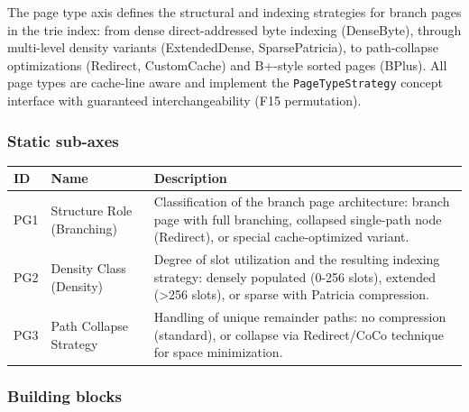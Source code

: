 The page type axis defines the structural and indexing strategies for branch pages in the trie index: from dense direct-addressed byte indexing (Dense\allowbreak{}Byte), through multi-level density variants (Extended\allowbreak{}Dense, Sparse\allowbreak{}Patricia), to path-collapse optimizations (Redirect, Custom\allowbreak{}Cache) and B+-style sorted pages (BPlus). All page types are cache-line aware and implement the \texttt{Page\allowbreak{}Type\allowbreak{}Strategy} concept interface with guaranteed interchangeability (F15 permutation).

\subsubsection*{Static sub-axes}

\begin{scriptsize}
\begin{longtable}{@{}>{\raggedright\arraybackslash}p{1.8cm} >{\raggedright\arraybackslash}p{3.2cm} >{\raggedright\arraybackslash}p{8.5cm}@{}}
\toprule
ID & Name & Description \\
\midrule
\endhead%
PG1 & Structure Role (Branching) & Classification of the branch page architecture: branch page with full branching, collapsed single-path node (Redirect), or special cache-optimized variant. \\
PG2 & Density Class (Density) & Degree of slot utilization and the resulting indexing strategy: densely populated (0-256 slots), extended (>256 slots), or sparse with Patricia compression. \\
PG3 & Path Collapse Strategy & Handling of unique remainder paths: no compression (standard), or collapse via Redirect/\allowbreak{}Co\allowbreak{}Co technique for space minimization. \\
\bottomrule
\end{longtable}
\end{scriptsize}

\subsubsection*{Building blocks}

